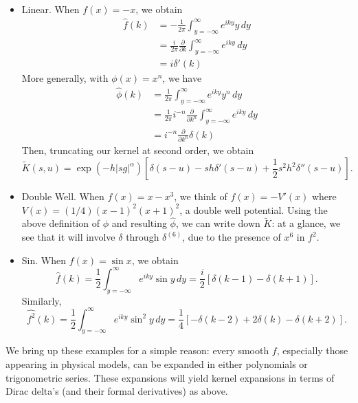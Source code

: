\documentclass[11pt,letterpaper]{article}
\begin{document}
\begin{itemize}
\item Linear.  When $f(x) = -x$, we obtain 
\begin{align}
\widehat{f}(k) &= - \frac{1}{2 \pi} \int_{y=-\infty}^\infty e^{i k y} y \, dy \nonumber \\
 &= \frac{i}{2 \pi} \frac{\partial}{\partial k} \int_{y=-\infty}^\infty e^{i k y} \, dy \nonumber \\
 &= i \delta'(k)
 \label{eqn:ft1}
 \end{align}
More generally, with $\phi(x) = x^n$, we have
\begin{align}
\widehat{\phi}(k) &= \frac{1}{2 \pi} \int_{y=-\infty}^\infty e^{i k y} y^n \, dy \nonumber \\
 &= \frac{1}{2 \pi} i^{-n} \frac{\partial}{\partial k^n} \int_{y=-\infty}^\infty e^{i k y} \, dy \nonumber \\
 \label{eqn:ftx}
 &= i^{-n} \frac{\partial}{\partial k^n} \delta(k)
 \end{align}
 Then, truncating our kernel at second order, we obtain
\[
\widetilde{K}(s,u) =  \exp{\left(  -h |s g|^{\alpha} \right)} \left[ \delta(s-u) - s h \delta'(s-u) + \frac{1}{2} s^2 h^2 \delta''(s-u) \right].
\]
\item Double Well.  When $f(x) = x - x^3$, we think of $f(x) = -V'(x)$ where $V(x) = (1/4) (x-1)^2 (x+1)^2$, a double well potential.  Using the above definition of $\phi$ and resulting $\widehat{\phi}$, we can write down $\widetilde{K}$: at a glance, we see that it will involve $\delta$ through $\delta^{(6)}$, due to the presence of $x^6$ in $f^2$.
\item Sin. When $f(x) = \sin x$, we obtain
\begin{equation}
\label{eqn:sinhat}
\widehat{f}(k) = \frac{1}{2} \int_{y=-\infty}^\infty e^{i k y} \sin y \, dy = \frac{i}{2} \left[ \delta(k-1) - \delta(k+1) \right].
\end{equation}
Similarly,
\begin{equation}
\label{eqn:sinsqhat}
\widehat{f^2}(k) = \frac{1}{2} \int_{y=-\infty}^\infty e^{i k y} \sin^2 y \, dy = \frac{1}{4} \left[ -\delta(k-2) + 2 \delta(k) - \delta(k+2) \right].
\end{equation}
\end{itemize}
We bring up these examples for a simple reason: every smooth $f$, especially those appearing in physical models, can be expanded in either polynomials or trigonometric series.  These expansions will yield kernel expansions in terms of Dirac delta's (and their formal derivatives) as above.
\end{document}
